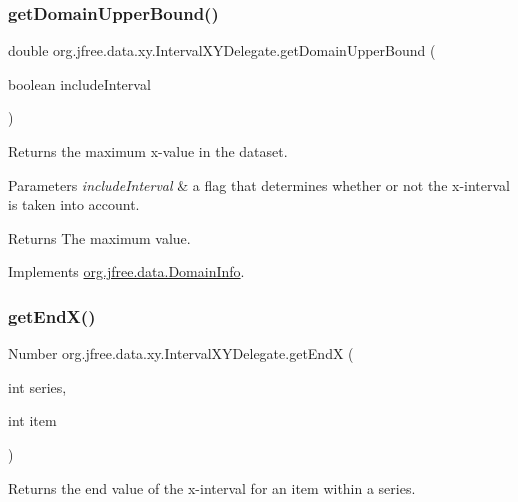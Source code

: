\subsubsection{\texorpdfstring{get\+Domain\+Upper\+Bound()}{getDomainUpperBound()}}
{\footnotesize\ttfamily double org.\+jfree.\+data.\+xy.\+Interval\+X\+Y\+Delegate.\+get\+Domain\+Upper\+Bound (\begin{DoxyParamCaption}\item[{boolean}]{include\+Interval }\end{DoxyParamCaption})}

Returns the maximum x-\/value in the dataset.


\begin{DoxyParams}{Parameters}
{\em include\+Interval} & a flag that determines whether or not the x-\/interval is taken into account.\\
\hline
\end{DoxyParams}
\begin{DoxyReturn}{Returns}
The maximum value. 
\end{DoxyReturn}


Implements \mbox{\hyperlink{interfaceorg_1_1jfree_1_1data_1_1_domain_info_a00e455f8db5bd8515266000cacc74e89}{org.\+jfree.\+data.\+Domain\+Info}}.

\mbox{\label{classorg_1_1jfree_1_1data_1_1xy_1_1_interval_x_y_delegate_a46859c55956ba9f85cd82672eeb8c25d}} 
\subsubsection{\texorpdfstring{get\+End\+X()}{getEndX()}}
{\footnotesize\ttfamily Number org.\+jfree.\+data.\+xy.\+Interval\+X\+Y\+Delegate.\+get\+EndX (\begin{DoxyParamCaption}\item[{int}]{series,  }\item[{int}]{item }\end{DoxyParamCaption})}

Returns the end value of the x-\/interval for an item within a series.


